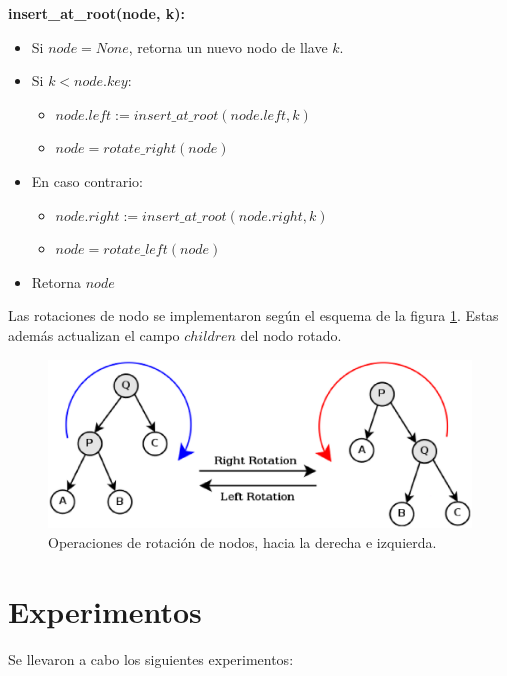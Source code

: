 \documentclass[12pt,letterpaper]{article}
\begin{document}
\textbf{insert\_at\_root(node, k):}
\begin{itemize}
\item	Si $node = None$, retorna un nuevo nodo de llave $k$.
\item	Si $k < node.key$:
	\begin{itemize}
	\item	$node.left := insert\_at\_root(node.left, k)$
	\item	$node = rotate\_right(node)$
	\end{itemize}
\item	En caso contrario:
	\begin{itemize}
	\item	$node.right := insert\_at\_root(node.right, k)$
	\item	$node = rotate\_left(node)$
	\end{itemize}
\item	Retorna $node$
\end{itemize}

Las rotaciones de nodo se implementaron según el esquema de la figura \ref{fig:rotaciones}. Estas además actualizan el campo $children$ del nodo rotado.

\begin{figure}[ht]
\centering
\includegraphics[scale=0.7]{rotations.eps}
\caption{Operaciones de rotación de nodos, hacia la derecha e izquierda.}
\label{fig:rotaciones}
\end{figure}

\section{Experimentos}
Se llevaron a cabo los siguientes experimentos:
\end{document}
